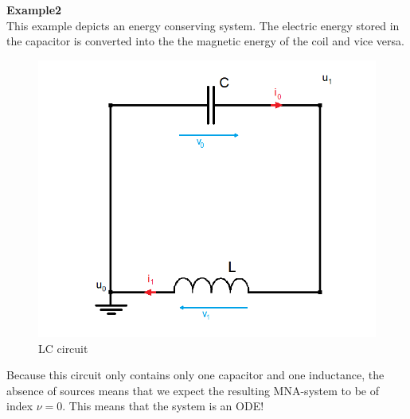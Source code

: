 \textbf{Example2} \\
	This example depicts an energy conserving system. The electric energy stored in the capacitor is converted into the the magnetic energy of the coil and vice versa.
	\begin{figure}[H]
		\centering
		\includegraphics[scale = 0.4]{pictures/Example2_index0.png}
		\caption{LC circuit}
	\end{figure}
	Because this circuit only contains only one capacitor and one inductance, the absence of sources means that we expect the resulting MNA-system to be of index $\nu=0$. This means that the system is an ODE!
	
